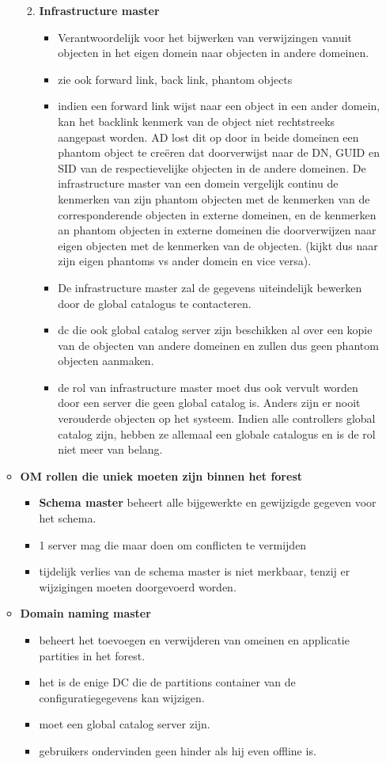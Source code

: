 \begin{enumerate}
\begin{itemize}
\begin{enumerate}
\clearpage
\item \textbf{Infrastructure master}
\begin{itemize}
\item Verantwoordelijk voor het bijwerken van verwijzingen vanuit objecten in het eigen domein naar objecten in andere domeinen.
\item zie ook forward link, back link, phantom objects
\item indien een forward link wijst naar een object in een ander domein, kan het backlink kenmerk van de object niet rechtstreeks aangepast worden. AD lost dit op door in beide domeinen een phantom object te cre\"eren dat doorverwijst naar de DN, GUID en SID van de respectievelijke objecten in de andere domeinen. De infrastructure master van een domein vergelijk continu de kenmerken van zijn phantom objecten met de kenmerken van de corresponderende objecten in externe domeinen, en de kenmerken an phantom objecten in externe domeinen die doorverwijzen naar eigen objecten met de kenmerken van de objecten. (kijkt dus naar zijn eigen phantoms vs ander domein en vice versa). 
\item De infrastructure master zal de gegevens uiteindelijk bewerken door de global catalogus te contacteren.
\item dc die ook global catalog server zijn beschikken al over een kopie van de objecten van andere domeinen en zullen dus geen phantom objecten aanmaken.
\item de rol van infrastructure master moet dus ook vervult worden door een server die geen global catalog is. Anders zijn er nooit verouderde objecten op het systeem. Indien alle controllers global catalog zijn, hebben ze allemaal een globale catalogus en is de rol niet meer van belang.
\end{itemize}
\end{enumerate}

\item \textbf{OM rollen die uniek moeten zijn binnen het forest}
\begin{itemize}
\item \textbf{Schema master} beheert alle bijgewerkte en gewijzigde gegeven voor het schema.
\item 1 server mag die maar doen om conflicten te vermijden
\item tijdelijk verlies van de schema master is niet merkbaar, tenzij er wijzigingen moeten doorgevoerd worden.
\end{itemize}

\item \textbf{Domain naming master}
\begin{itemize}
\item beheert het toevoegen en verwijderen van omeinen en applicatie partities  in het forest. 
\item het is de enige DC die de partitions container van de configuratiegegevens kan wijzigen.
\item moet een global catalog server zijn.
\item gebruikers ondervinden geen hinder als hij even offline is.
\end{itemize}


\end{itemize}
\end{enumerate}
